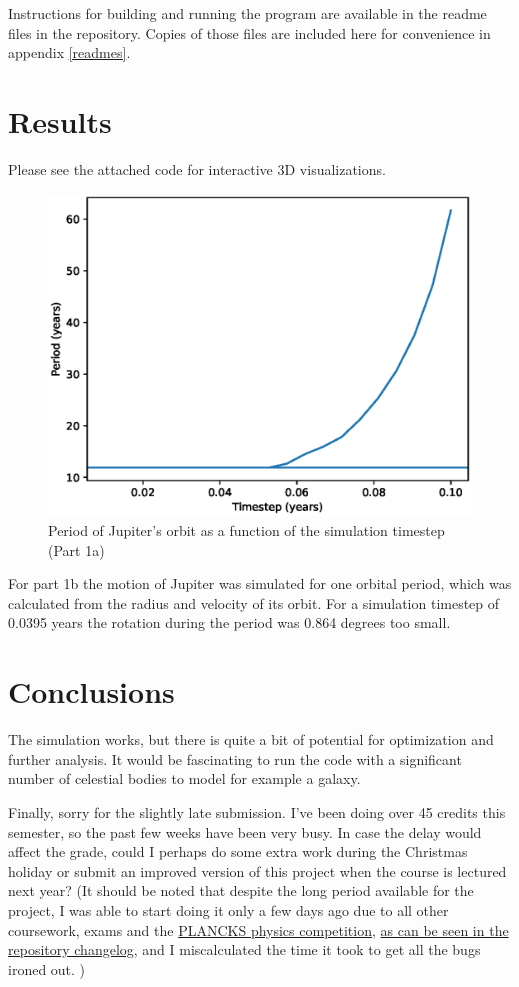 \documentclass[a4paper]{article}
\begin{document}
Instructions for building and running the program are available in the readme files in the repository.
Copies of those files are included here for convenience in appendix \ref{readmes}.




\clearpage
\section{Results}
Please see the attached code for interactive 3D visualizations.

\begin{figure}[ht!]
\includegraphics[width=\textwidth]{fig_1a.eps}
\caption{Period of Jupiter's orbit as a function of the simulation timestep (Part 1a)}
\end{figure}

For part 1b the motion of Jupiter was simulated for one orbital period, which was calculated from the radius and velocity of its orbit.
For a simulation timestep of 0.0395 years the rotation during the period was 0.864 degrees too small.


\FloatBarrier
\section{Conclusions}
The simulation works, but there is quite a bit of potential for optimization and further analysis.
It would be fascinating to run the code with a significant number of celestial bodies to model for example a galaxy.

Finally, sorry for the slightly late submission.
I've been doing over 45 credits this semester, so the past few weeks have been very busy.
In case the delay would affect the grade, could I perhaps do
some extra work during the Christmas holiday or submit an improved version of this project
when the course is lectured next year?
(It should be noted that despite the long period available for the project, I was able to start doing it only
a few days ago due to all other coursework, exams and the
\href{https://www.plancks.uk/london2020}{PLANCKS physics competition},
\href{https://github.com/AgenttiX/planetary-motion/commits/main}{as can be seen in the repository changelog},
and I miscalculated the time it took to get all the bugs ironed out.
)
\end{document}
